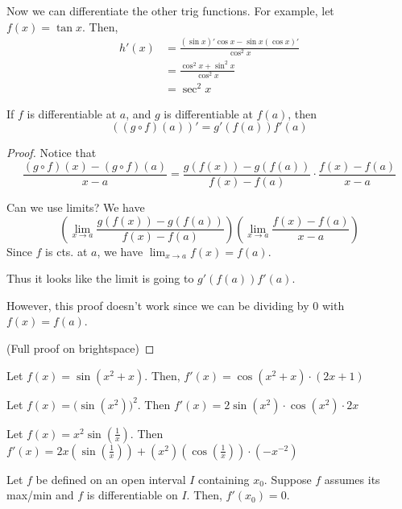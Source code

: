 \documentclass{article}
\begin{document}
\begin{corollary}
Now we can differentiate the other trig functions. For example, let $f(x) = \tan x$. Then, \begin{align*}
    h'(x) &= \frac{(\sin x)' \cos x - \sin x(\cos x)'}{\cos^2x}\\
    &= \frac{\cos^2x+\sin^2x}{\cos^2x}\\
    &= \sec^2 x
\end{align*}
\end{corollary}
\begin{cthm}
    If $f$ is differentiable at $a$, and $g$ is differentiable at $f(a)$, then \[
    \left((g\circ f)(a)\right)' = g'(f(a))f'(a)
    \]
\end{cthm}
\begin{proof}
    Notice that \[
    \frac{(g \circ f)(x) - (g \circ f)(a)}{x-a} = \frac{g(f(x)) - g(f(a))}{f(x) - f(a)} \cdot \frac{f(x) - f(a)}{x-a}
    \]

    Can we use limits?
    We have \[
    \left(\lim_{x\to a}\frac{g(f(x)) - g(f(a))}{f(x)-f(a)}\right)\left(\lim_{x\to a} \frac{f(x) - f(a)}{x-a}\right)
    \]
    Since $f$ is cts. at $a$, we have $\lim_{x\to a} f(x) = f(a)$.

    Thus it looks like the limit is going to $g'(f(a)) f'(a)$.

    However, this proof doesn't work since we can be dividing by $0$ with $f(x) = f(a)$.

    (Full proof on brightspace)
\end{proof}
\begin{example}
    Let $f(x) = \sin (x^2 + x)$. Then, $f'(x) = \cos (x^2 + x) \cdot (2x + 1)$

    Let $f(x) = \big( \sin (x^2)\big)^2$. Then $f'(x) = 2\sin(x^2) \cdot \cos (x^2) \cdot 2x$

    Let $f(x) = x^2 \sin \left(\frac{1}{x}\right)$. Then $f'(x) = 2x(\sin \left(\frac{1}{x}\right)) + (x^2)(\cos \left(\frac{1}{x}\right)) \cdot (-x^{-2})$
\end{example}
\begin{cthm}[Theorem 29.1]
    Let $f$ be defined on an open interval $I$ containing $x_0$. Suppose $f$ assumes its max/min and $f$ is differentiable on $I$. Then, $f'(x_0) = 0$.
\end{cthm}
\end{document}
